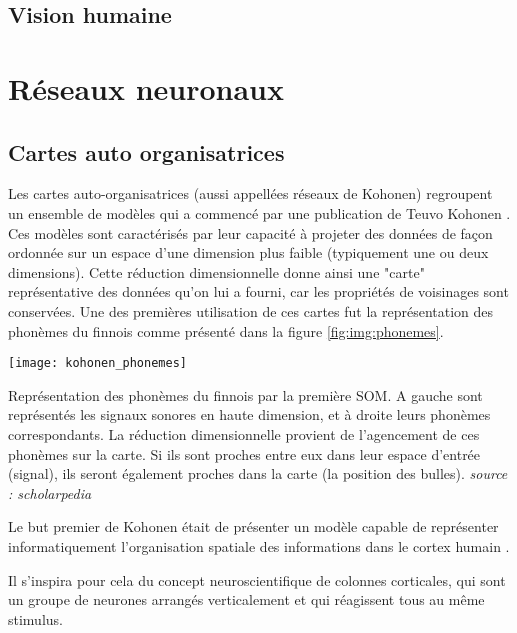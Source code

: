 \subsection{Vision humaine}

\newpage
\section{Réseaux neuronaux}
\subsection{Cartes auto organisatrices}

	Les cartes auto-organisatrices (aussi appellées réseaux de Kohonen) regroupent un ensemble de modèles qui a commencé par une publication de Teuvo Kohonen \cite{kohonen-som82}. Ces modèles sont caractérisés par leur capacité à projeter des données de façon ordonnée sur un espace d'une dimension plus faible (typiquement une ou deux dimensions). Cette réduction dimensionnelle donne ainsi une "carte" représentative des données qu'on lui a fourni, car les propriétés de voisinages sont conservées. Une des premières utilisation de ces cartes fut la représentation des phonèmes du finnois comme présenté dans la figure \ref{fig:img:phonemes}.

	\begin{figureth}
		\texttt{[image: kohonen\_phonemes]}
		\caption[Phonème SOM]{Représentation des phonèmes du finnois par la première SOM. A gauche sont représentés les signaux sonores en haute dimension, et à droite leurs phonèmes correspondants. La réduction dimensionnelle provient de l'agencement de ces phonèmes sur la carte. Si ils sont proches entre eux dans leur espace d'entrée (signal), ils seront également proches dans la carte (la position des bulles). \textit{source : scholarpedia}}\label{fig:img:phonemes}

	\end{figureth}

	Le but premier de Kohonen était de présenter un modèle capable de représenter informatiquement l'organisation spatiale des informations dans le cortex humain \cite{kohonen-memory}. 
	
	Il s'inspira pour cela du concept neuroscientifique de colonnes corticales, qui sont un groupe de neurones arrangés verticalement et qui réagissent tous au même stimulus.


